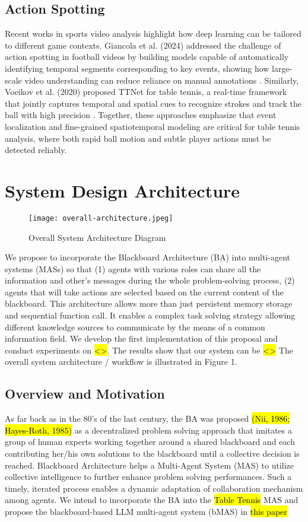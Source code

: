 \documentclass[conference]{IEEEtran}
\begin{document}
\subsection{Action Spotting}

Recent works in sports video analysis highlight how deep learning can be tailored to different game contexts. Giancola et al. (2024) addressed the challenge of action spotting in football videos by building models capable of automatically identifying temporal segments corresponding to key events, showing how large-scale video understanding can reduce reliance on manual annotations \cite{giancola}. Similarly, Voeikov et al. (2020) proposed TTNet for table tennis, a real-time framework that jointly captures temporal and spatial cues to recognize strokes and track the ball with high precision \cite{ttnet}. Together, these approaches emphasize that event localization and fine-grained spatiotemporal modeling are critical for table tennis analysis, where both rapid ball motion and subtle player actions must be detected reliably.

\section{System Design Architecture}
\begin{figure}
    \centering
    \texttt{[image: overall-architecture.jpeg]}
    \caption{Overall System Architecture Diagram}
    \label{fig:placeholder}
\end{figure}
We propose to incorporate the Blackboard Architecture (BA) into multi-agent systems (MASs) so that (1) agents with various roles can share all the information and other's messages during the whole problem-solving process, (2) agents that will take actions are selected based on the current content of the blackboard. 
This architecture allows more than just persistent memory storage and sequential function call. It enables a complex task 
solving strategy allowing different knowledge sources to communicate by the means of a common information field. 
We develop the first implementation of this proposal and conduct experiments on \hl{<>}. The results show that our system can be \hl{<>}
The overall system architecture / workflow is illustrated in Figure 1.
\subsection{Overview and Motivation}
As far back as in the 80’s of the last century, the BA was proposed \hl{(Nii, 1986; Hayes-Roth, 1985)} as a decentralized problem solving approach that imitates a group of human experts working together around a shared blackboard and each contributing her/his own solutions to the blackboard until a collective decision is reached. 
Blackboard Architecture helps a Multi-Agent System (MAS) to utilize collective intelligence to further enhance problem solving performances. 
Such a timely, iterated process enables a dynamic adaptation of collaboration mechanism among agents.
We intend to incorporate the BA into the \hl{Table Tennis} MAS and propose the blackboard-based LLM multi-agent system (bMAS) in \hl{this paper}
\end{document}
